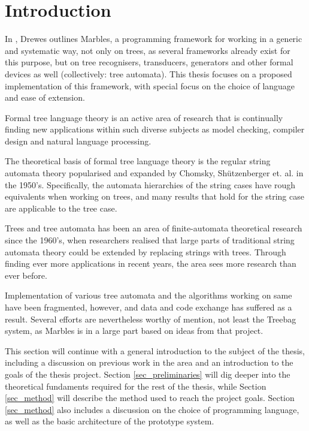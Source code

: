 \section{Introduction}

In \cite{drewes_marbles}, Drewes outlines Marbles, a programming framework
for working in a generic and systematic way, not only on trees, as several
frameworks already exist for this purpose, but on tree recognisers,
transducers, generators and other formal devices as well (collectively:
tree automata). This thesis focuses on a proposed implementation of this
framework, with special focus on the choice of language and ease of
extension.

Formal tree language theory is an active area of research that is
continually finding new applications within such diverse subjects as model
checking, compiler design and natural language processing. 

The theoretical basis of formal tree language theory is the regular string
automata theory popularised and expanded by Chomsky, Shützenberger et. al.
in the 1950's. Specifically, the automata hierarchies of the string cases
have rough equivalents when working on trees, and many results that hold
for the string case are applicable to the tree case. 

Trees and tree automata has been an area of finite-automata theoretical
research since the 1960's, when researchers realised that large parts of
traditional string automata theory could be extended by replacing strings
with trees. Through finding ever more applications in recent years, the
area sees more research than ever before. 

Implementation of various tree automata and the algorithms working on same
have been fragmented, however, and data and code exchange has suffered as a
result. Several efforts are nevertheless worthy of mention, not least the
Treebag\cite{drewes_treebag} system, as Marbles is in a large part based on
ideas from that project.


This section will continue with a general introduction to the subject
of the thesis, including a discussion on previous work in the area and an
introduction to the goals of the thesis project. Section
\ref{sec_preliminaries} will dig deeper into the theoretical fundaments
required for the rest of the thesis, while Section \ref{sec_method} will
describe the method used to reach the project goals. Section
\ref{sec_method} also includes a discussion on the choice of programming
language, as well as the basic architecture of the prototype system.

